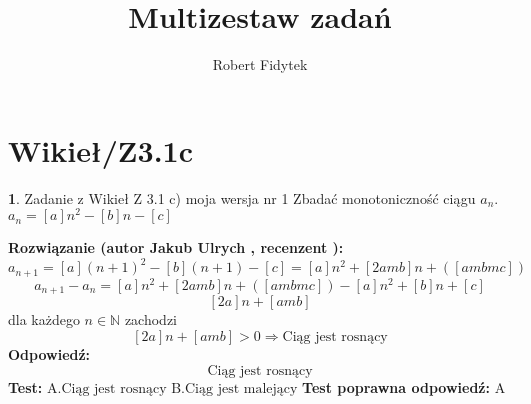 \documentclass[12pt, a4paper]{article}
\title{Multizestaw zadań}
\author{Robert Fidytek}
\date{}
\theoremstyle{definition} %
\newtheorem{zad}{}
\newcommand{\kategoria}[1]{\section{#1}} %
\newcommand{\zadStart}[1]{\begin{zad}#1\newline} %
\newcommand{\zadStop}{\end{zad}}   %
\newcommand{\rozwStart}[2]{\noindent \textbf{Rozwiązanie (autor #1 , recenzent #2): }\newline} %
\newcommand{\rozwStop}{\newline}                                            %
\newcommand{\odpStart}{\noindent \textbf{Odpowiedź:}\newline}    %
\newcommand{\odpStop}{\newline}                                             %
\newcommand{\testStart}{\noindent \textbf{Test:}\newline} %
\newcommand{\testStop}{\newline} %
\newcommand{\kluczStart}{\noindent \textbf{Test poprawna odpowiedź:}\newline} %
\newcommand{\kluczStop}{\newline} %
\begin{document}
\maketitle


\kategoria{Wikieł/Z3.1c}
\zadStart{Zadanie z Wikieł Z 3.1 c) moja wersja nr 1}
Zbadać monotoniczność ciągu $a_{n}$.\\ $a_{n}=[a]n^{2}-[b]n-[c]$
\zadStop
\rozwStart{Jakub Ulrych}{}
$$a_{n+1}=[a](n+1)^{2}-[b](n+1)-[c]=[a]n^{2}+[2amb]n+([ambmc])$$
$$a_{n+1}-a_{n}=[a]n^{2}+[2amb]n+([ambmc])-[a]n^{2}+[b]n+[c]$$
$$[2a]n+[amb]$$
dla każdego $n\in\mathbb{N}$ zachodzi
$$[2a]n+[amb]>0\Rightarrow\text{Ciąg jest rosnący}$$
\rozwStop
\odpStart
$$\text{Ciąg jest rosnący}$$
\odpStop
\testStart
A.$\text{Ciąg jest rosnący}$
B.$\text{Ciąg jest malejący}$
\testStop
\kluczStart
A
\kluczStop
\end{document}

